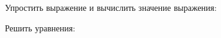 \begin{enumcols}[label=\textbf{\arabic*.}]
	\item {}
	\item {}
	\item {}
	\item Упростить выражение и вычислить значение выражения:
	\begin{enumcols}[itemcolumns=1]
		\item {}
		\item {}
	\end{enumcols}
	\item {}
	\item {}
	\item {}
	\item Решить уравнения:
	\begin{enumcols}[itemcolumns=1]
		\item {}
		\item {}
		\item {}
		\item {}
		\item {}
	\end{enumcols}
\end{enumcols}
